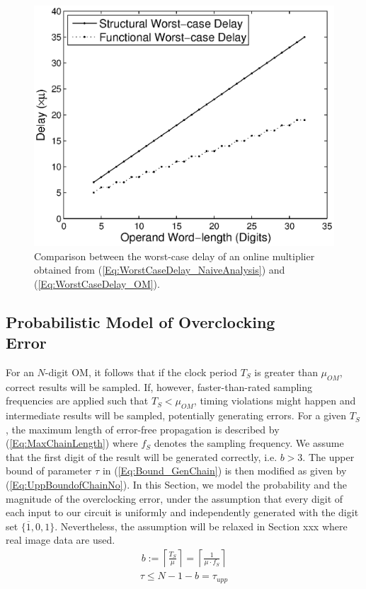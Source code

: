 \documentclass{acm_proc_article-sp}
\begin{document}
%
\begin{figure}[t]
    \centering
    \includegraphics[width=.4\textwidth]{./Figures/Gap.eps}
    \caption{Comparison between the worst-case delay of an online multiplier obtained from (\ref{Eq:WorstCaseDelay_NaiveAnalysis}) and (\ref{Eq:WorstCaseDelay_OM}).}
\label{Fig:Gap_OM}
\end{figure}


\subsection{Probabilistic Model of Overclocking \\Error}
For an $N$-digit OM, it follows that if the clock period $T_S$ is greater than $\mu_{OM}$, correct results will be sampled. If, however, faster-than-rated sampling frequencies are applied such that $T_S<\mu_{OM}$, timing violations might happen and intermediate results will be sampled, potentially generating errors. For a given $T_S$, the maximum length of error-free propagation is described by (\ref{Eq:MaxChainLength}) where $f_S$ denotes the sampling frequency. We assume that the first digit of the result will be generated correctly, i.e. $b>3$. The upper bound of parameter $\tau$ in (\ref{Eq:Bound_GenChain}) is then modified as given by (\ref{Eq:UppBoundofChainNo}). In this Section, we model the probability and the magnitude of the overclocking error, under the assumption that every digit of each input to our circuit is uniformly and independently generated with the digit set $\{\overline{1},0,1\}$. Nevertheless, the assumption will be relaxed in Section xxx where real image data are used.
%
\begin{eqnarray}\label{Eq:MaxChainLength}
  b:=\left\lceil \frac{T_S}{\mu} \right\rceil=\left\lceil \frac{1}{\mu\cdot f_S}\right\rceil
\end{eqnarray}
%
%
\begin{eqnarray}\label{Eq:UppBoundofChainNo}
  \tau\leqslant N-1-b=\tau_{upp}
\end{eqnarray}
\end{document}

